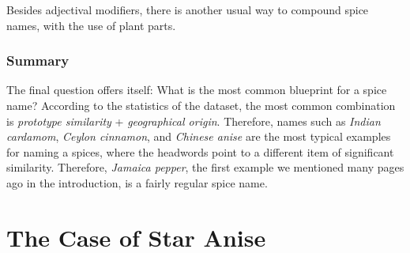 Besides adjectival modifiers, there is another usual way to compound spice names, with the use of plant parts.


\subsubsection{Summary}

The final question offers itself: What is the most common blueprint for a spice name? According to the statistics of the dataset, the most common combination is \textit{prototype similarity} + \textit{geographical origin}. Therefore, names such as \textit{Indian cardamom}, \textit{Ceylon cinnamon}, and \textit{Chinese anise} are the most typical examples for naming a spices, where the headwords point to a different item of significant similarity. Therefore, \textit{Jamaica pepper}, the first example we mentioned many pages ago in the introduction, is a fairly regular spice name.

















\section{The Case of Star Anise}
\label{sec:case_star_anise}

